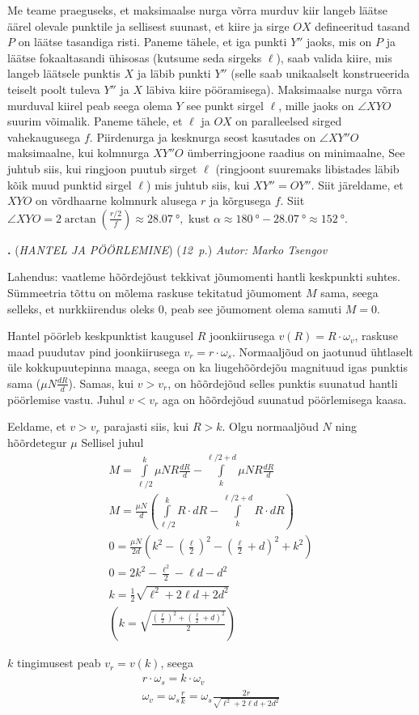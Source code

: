 \documentclass[11pt,a5paper]{article}
\newcommand{\numb}[1]{\vspace{5pt}\textbf{\large #1}}
\newcommand{\nimi}[1]{(\textsl{\small #1})}
\newcommand{\punktid}[1]{(\emph{#1~p.})}
\newcounter{ylesanne}
\newcommand{\yl}[1]{\addtocounter{ylesanne}{1}\numb{\theylesanne.} \nimi{#1} \newblock{}}
\newcommand{\autor}[1]{\emph{ Autor: #1}}%
\begin{document}
Me teame praeguseks, et maksimaalse nurga võrra murduv kiir langeb läätse äärel olevale punktile ja sellisest suunast, et kiire ja sirge $OX$ defineeritud tasand $P$ on läätse tasandiga risti. Paneme tähele, et iga punkti $Y''$ jaoks, mis on $P$ ja läätse fokaaltasandi ühisosas (kutsume seda sirgeks $\ell$), saab valida kiire, mis langeb läätsele punktis $X$ ja läbib punkti $Y''$ (selle saab unikaalselt konstrueerida teiselt poolt tuleva $Y''$ ja $X$ läbiva kiire pööramisega). Maksimaalse nurga võrra murduval kiirel peab seega olema $Y$ see punkt sirgel $\ell$, mille jaoks on $\angle XYO$ suurim võimalik. Paneme tähele, et $\ell$ ja $OX$ on paralleelsed sirged vahekaugusega $f$. Piirdenurga ja kesknurga seost kasutades on $\angle XY''O$ maksimaalne, kui kolmnurga $XY''O$ ümberringjoone raadius on minimaalne, See juhtub siis, kui ringjoon puutub sirget $\ell$ (ringjoont suuremaks libistades läbib kõik muud punktid sirgel $\ell$) mis juhtub siis, kui $XY''=OY''$. Siit järeldame, et $XYO$ on võrdhaarne kolmnurk alusega $r$ ja kõrgusega $f$. Siit $\angle XYO=2\arctan\left(\frac{r/2}{f}\right)\approx \SI{28.07}{\degree},$ kust $\alpha\approx \SI{180}{\degree}-\SI{28.07}{\degree} \approx \SI{152}{\degree}$.




\yl{HANTEL JA PÖÖRLEMINE}
\punktid{12} \autor{Marko Tsengov}

Lahendus: vaatleme hõõrdejõust tekkivat jõumomenti hantli keskpunkti suhtes. Sümmeetria tõttu on mõlema raskuse tekitatud jõumoment $M$ sama, seega selleks, et nurkkiirendus oleks $0$, peab see jõumoment olema samuti $M = 0$.

Hantel pöörleb keskpunktist kaugusel $R$ joonkiirusega $v(R) = R \cdot \omega_v$, raskuse maad puudutav pind joonkiirusega $v_r = r \cdot \omega_s$. Normaaljõud on jaotunud ühtlaselt üle kokkupuutepinna maaga, seega on ka liugehõõrdejõu magnituud igas punktis sama ($\mu N \frac{dR}{d}$). Samas, kui $v > v_r$, on hõõrdejõud selles punktis suunatud hantli pöörlemise vastu. Juhul $v < v_r$ aga on hõõrdejõud suunatud pöörlemisega kaasa.

Eeldame, et $v > v_r$ parajasti siis, kui $R > k$. Olgu normaaljõud $N$ ning hõõrdetegur $\mu$ Sellisel juhul
\begin{gather*}
    M = \int\limits_{\ell / 2}^{k} \mu N R \frac{dR}{d} - \int\limits_{k}^{\ell/2 + d} \mu N R \frac{dR}{d} \\
    M = \frac{\mu N}{d} \left ( \int\limits_{\ell / 2}^{k} R \cdot dR - \int\limits_{k}^{\ell/2 + d} R \cdot dR \right ) \\
    0 = \frac{\mu N}{2 d} \left ( k^2 - \left ( \frac{\ell}{2} \right )^2 - \left ( \frac{\ell}{2} + d \right )^2 + k^2 \right ) \\
    0 = 2 k^2 - \frac{\ell^2}{2} - \ell d - d^2 \\
    k = \frac{1}{2} \sqrt{\ell^2 + 2 \ell d + 2 d^2} \\
    \left ( k = \sqrt{\frac{\left ( \frac{\ell}{2}\right )^2 + \left ( \frac{\ell}{2} + d \right )^2}{2}}\right )
\end{gather*}

$k$ tingimusest peab $v_r = v(k)$, seega
\begin{gather*}
    r \cdot \omega_s = k \cdot \omega_v \\
    \omega_v = \omega_s \frac{r}{k} = \omega_s \frac{2r}{\sqrt{\ell^2 + 2 \ell d + 2 d^2}}
\end{gather*}
\end{document}

